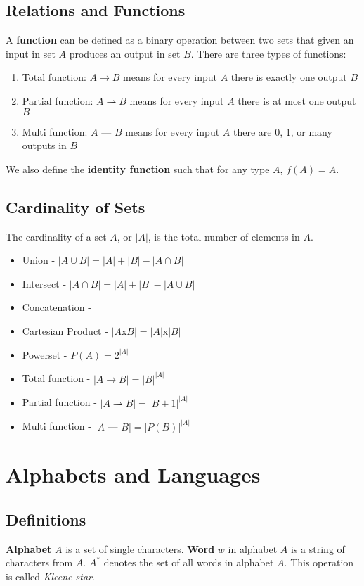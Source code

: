 \documentclass{article}
\begin{document}
		\subsection{Relations and Functions}
		A \textbf{function} can be defined as a binary operation between two sets that given an input in set $A$ produces an output in set $B$. There are three types of functions:
		\begin{enumerate}
			\item Total function: $A \rightarrow B$ means for every input $A$ there is exactly one output $B$
			\item Partial function: $A \rightharpoonup B$ means for every input $A$ there is at most one output $B$
			\item Multi function: $A$ --- $B$ means for every input $A$ there are 0, 1, or many outputs in $B$
		\end{enumerate}
		We also define the \textbf{identity function} such that for any type $A$, $f(A) = A$.
		\subsection{Cardinality of Sets}
		The cardinality of a set $A$, or $|A|$, is the total number of elements in $A$.
		\begin{itemize}
				\item Union - $|A \cup B| = |A| + |B| - |A \cap B|$
				\item Intersect - $ |A \cap B| = |A| + |B| - |A\cup B|$
				\item Concatenation - 
				\item Cartesian Product - $|A \text{x} B|  = |A| \text{x} |B|$
				\item Powerset - $P(A) = 2^{|A|}$
				\item Total function - $|A \rightarrow B| = |B|^{|A|}$
				\item Partial function - $|A \rightharpoonup B| = |B+1|^{|A|}$
				\item Multi function - $|A$ --- $B| = |P(B)|^{|A|}$
			\end{itemize}
	\section{Alphabets and Languages}
		\subsection{Definitions}
		\textbf{Alphabet} $A$ is a set of single characters. \textbf{Word} $w$ in alphabet $A$ is a string of characters from $A$. $A^*$ denotes the set of all words in alphabet $A$. This operation is called \emph{Kleene star}.
\end{document}
